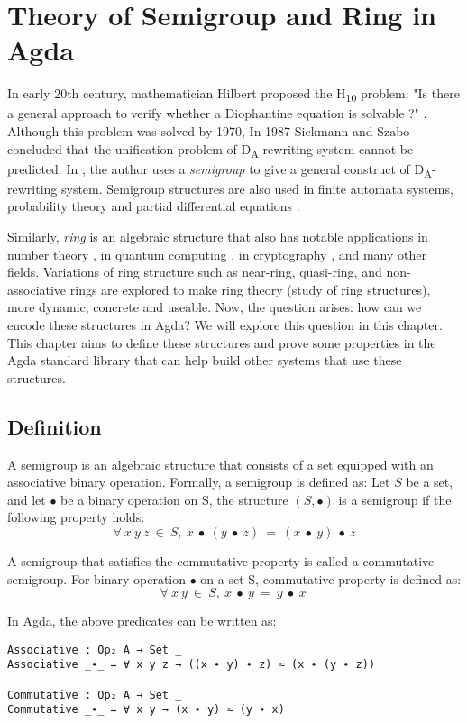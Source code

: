 \chapter{Theory of Semigroup and Ring in Agda}
In early 20th century, mathematician Hilbert proposed the H\textsubscript{10}
problem: "Is there a general approach to verify whether a Diophantine equation
is solvable ?" \cite{larchey2020hilbert}. Although this problem was solved by
1970, In 1987 Siekmann and Szabo concluded that the unification problem of
D\textsubscript{A}-rewriting system\cite{DARewriting} cannot be predicted. In
\cite{deng2016characterizations}, the author uses a \textit{semigroup} to give a
general construct of D\textsubscript{A}-rewriting system. Semigroup structures
are also used in finite automata systems, probability theory and partial
differential equations \cite{liaqat2021some}.

Similarly, \textit{ring} is an algebraic structure that also has notable
applications in number theory \cite{pedrouzo2021revisiting}, in quantum computing
\cite{netto2008influence}, in cryptography \cite{khathuria2021algebraic}, and many other
fields. Variations of ring structure such as near-ring, quasi-ring, and
non-associative rings are explored to make ring theory (study of ring
structures), more dynamic, concrete and useable. Now, the question arises: how
can we encode these structures in Agda? We will explore this question in this
chapter. This chapter aims to define these structures and prove some properties
in the Agda standard library that can help build other systems that use these
structures. 

\section{Definition}
A semigroup is an algebraic structure that consists of a set equipped with an
associative binary operation. Formally, a semigroup is defined as: Let $S$ be a
set, and let $∙$ be a binary operation on S, the structure $(S,∙)$ is a
semigroup if the following property holds:
\[\forall\ x\ y\ z\ \in\ S ,\ x\ ∙\ (y\ ∙\ z)\ =\ (x\ ∙\ y)\ ∙\ z\]

A semigroup that satisfies the commutative property is called a commutative
semigroup. For binary operation \( ∙ \) on a set S, commutative property is
defined as:
\[ \forall\ x\ y\ \in\ S ,\ x\ ∙\ y\ =\ y\ ∙\ x\ \]

In Agda, the above predicates can be written as:

\begin{verbatim}
Associative : Op₂ A → Set _
Associative _∙_ = ∀ x y z → ((x ∙ y) ∙ z) ≈ (x ∙ (y ∙ z))

Commutative : Op₂ A → Set _
Commutative _∙_ = ∀ x y → (x ∙ y) ≈ (y ∙ x)
\end{verbatim}

